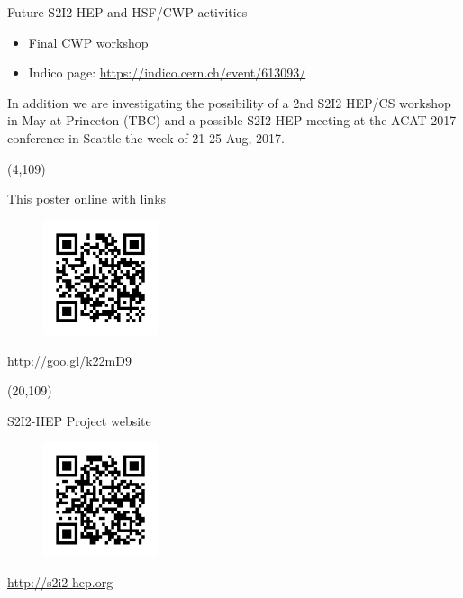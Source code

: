 \documentclass[final]{beamer}
\begin{document}
\begin{frame}{}
\begin{textblock}{38.0}
\begin{block}{Future S2I2-HEP and HSF/CWP activities}
\begin{itemize}
\begin{itemize}
    \item Final CWP workshop
    \item Indico page: \url{https://indico.cern.ch/event/613093/}
    \end{itemize}
\end{itemize}
In addition we are investigating the possibility of a 2nd S2I2 HEP/CS workshop in May at Princeton (TBC) and a possible S2I2-HEP meeting at the ACAT 2017 conference in Seattle the week of 21-25 Aug, 2017.
\end{block}
\end{textblock}










\begin{textblock}{14.0}(4,109)
\begin{block}{This poster online with links}
\begin{figure}[tbph]
\centering
\includegraphics[width=0.30\textwidth]{images/qr-s2i2-hep-si2-pi-workshop-2017.png}
\end{figure}
\begin{center}
\url{http://goo.gl/k22mD9}
\end{center}
\end{block}
\end{textblock}


\begin{textblock}{14.0}(20,109)
\begin{block}{S2I2-HEP Project website}
\begin{figure}[tbph]
\centering
\includegraphics[width=0.30\textwidth]{images/qr-s2i2-hep.png}
\end{figure}
\begin{center}
\url{http://s2i2-hep.org}
\end{center}
\end{block}
\end{textblock}




\end{frame}
\end{document}
